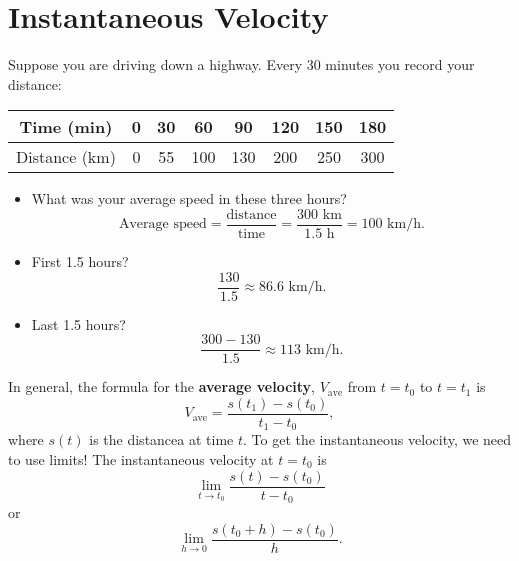 \section{Instantaneous Velocity}
Suppose you are driving down a highway. Every 30 minutes you record your distance:
\begin{center}
    \begin{tabular}{cccccccc}
        Time (min)    & 0 & 30 & 60  & 90  & 120 & 150 & 180 \\
        \midrule
        Distance (km) & 0 & 55 & 100 & 130 & 200 & 250 & 300
    \end{tabular}
\end{center}
\begin{itemize}
    \item What was your average speed in these three hours?
          \[ \text{Average speed}=\frac{\text{distance}}{\text{time}}=\frac{300\text{ km}}{1.5\text{ h}}=100\text{ km/h}. \]
    \item First 1.5 hours?
          \[ \frac{130}{1.5}\approx 86.6\text{ km/h}. \]
    \item Last 1.5 hours?
          \[ \frac{300-130}{1.5}\approx 113\text{ km/h}. \]
\end{itemize}
In general, the formula for the \textbf{average velocity}, $ V_{\text{ave}} $ from $ t=t_0 $ to $ t=t_1 $ is
\[ V_{\text{ave}}=\frac{s(t_1)-s(t_0)}{t_1-t_0}, \]
where $ s(t) $ is the distancea at time $ t $. To get the instantaneous velocity, we need to use limits!
The instantaneous velocity at $ t=t_0 $ is
\[ \lim\limits_{{t} \to {t_0}}\frac{s(t)-s(t_0)}{t-t_0} \]
or
\[ \lim\limits_{{h} \to {0}}\frac{s(t_0+h)-s(t_0)}{h}. \]
